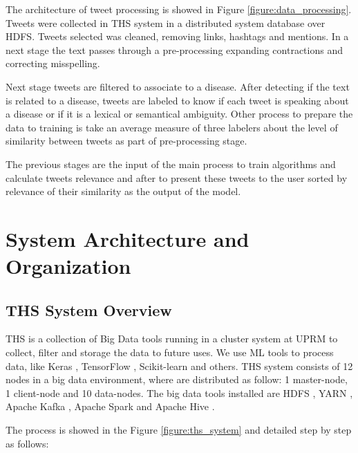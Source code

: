 \documentclass[12pt]{report}
\begin{document}
The architecture of tweet processing is showed in Figure \ref{figure:data_processing}. Tweets were collected in \ac{THS} system in a distributed system database over \ac{HDFS}. Tweets selected was cleaned, removing links, hashtags and mentions. In a next stage the text passes through a pre-processing expanding contractions and correcting misspelling.

Next stage tweets are filtered to associate to a disease. After detecting if the text is related to a disease, tweets are labeled to know if each tweet is speaking about a disease or if it is a lexical or semantical ambiguity. Other process to prepare the data to training is take an average measure of three labelers about the level of similarity between tweets as part of pre-processing stage.

The previous stages are the input of the main process to train algorithms and calculate tweets relevance and after to present these tweets to the user sorted by relevance of their similarity as the output of the model.

\chapter{System Architecture and Organization} \label{chapter 4}
\section{THS System Overview} \label{ths_system}

\ac{THS} is a collection of Big Data tools running in a cluster system at \ac{UPRM} to collect, filter and storage the data to future uses. We use \ac{ML} tools to process data, like Keras \cite{Keras2019}, TensorFlow \cite{Tensor2019}, Scikit-learn and others. \ac{THS} system consists of 12 nodes in a big data environment, where are distributed as follow: 1 master-node, 1 client-node and 10 data-nodes. The big data tools installed are \ac{HDFS} \cite{Hadoop2019}, \ac{YARN} \cite{Hadoop2019},  Apache Kafka \cite{Kafka2019}, Apache Spark \cite{Spark2019} and Apache Hive \cite{Hive2019}.

The process is showed in the Figure \ref{figure:ths_system} and detailed step by step as follows:
\end{document}
